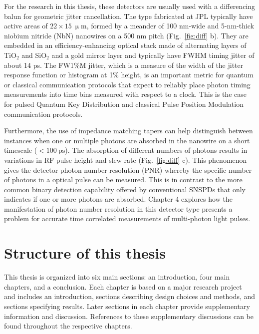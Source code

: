 \documentclass[11pt]{caltech_thesis} %
\begin{document}
For the research in this thesis, these detectors are usually used with a differencing balun for geometric jitter cancellation. The type fabricated at JPL typically have active areas of $22 \times 15 \ \mathrm{\upmu m}$, formed by a meander of 100 nm-wide and 5-nm-thick niobium nitride (NbN) nanowires on a 500 nm pitch (Fig.~\ref{fig:diff} b). They are embedded in an efficiency-enhancing optical stack made of alternating layers of TiO$_2$ and SiO$_2$ and a gold mirror layer and typically have FWHM timing jitter of about 14 ps. The FW1\%M jitter, which is a measure of the width of the jitter response function or histogram at 1\% height, is an important metric for quantum or classical communication protocols that expect to reliably place photon timing measurements into time bins measured with respect to a clock. This is the case for pulsed Quantum Key Distribution and classical Pulse Position Modulation communication protocols.

Furthermore, the use of impedance matching tapers can help distinguish between instances when one or multiple photons are absorbed in the nanowire on a short timescale ($< 100~\mathrm{ps}$). The absorption of different numbers of photons results in variations in RF pulse height and slew rate (Fig.~\ref{fig:diff} c). This phenomenon gives the detector photon number resolution (PNR) whereby the specific number of photons in a optical pulse can be measured. This is in contrast to the more common binary detection capability offered by conventional SNSPDs that only indicates if one or more photons are absorbed. Chapter 4 explores how the manifestation of photon number resolution in this detector type presents a problem for accurate time correlated measurements of multi-photon light pulses.

\hypertarget{structure-of-this-thesis}{%
\section{Structure of this thesis}\label{structure-of-this-thesis}}

This thesis is organized into six main sections: an introduction, four main chapters, and a conclusion. Each chapter is based on a major research project and includes an introduction, sections describing design choices and methods, and sections specifying results. Later sections in each chapter provide supplementary information and discussion. References to these supplementary discussions can be found throughout the respective chapters.
\end{document}
